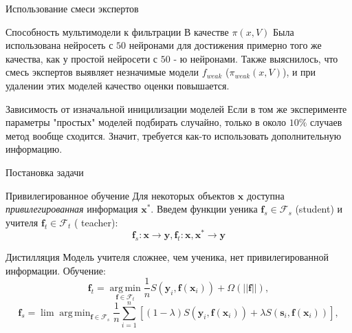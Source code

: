 \documentclass{beamer}
\DeclareMathOperator*{\argmin}{arg\,min}
\begin{document}
\begin{frame}{Использование смеси экспертов}
\begin{block}{Способность мультимодели к фильтрации}
В качестве $\pi(x, V)$ Была использована нейросеть с $50$ нейронами для достижения примерно того же качества, как у  простой нейросети  с $50$ - ю нейронами. Также выяснилось, что смесь экспертов выявляет незначимые модели $f_{weak}$ ($\pi_{weak} (x, V)$), и при удалении этих моделей качество оценки повышается. 
\end{block}


\begin{block}{Зависимость от изначальной иницилизации моделей}
Если в том же эксперименте  параметры "простых" моделей  подбирать случайно, только в около $10 \% $ случаев метод вообще  сходится. Значит, требуется как-то использовать дополнительную информацию.
\end{block}
\end{frame}


\begin{frame}{Постановка задачи}


 \begin{block}{Привилегированное обучение}
 Для некоторых объектов $\mathbf{x}$ доступна \emph{привилегированная} информация $\mathbf{x}^*$. Введем функции уеника $\mathbf{f}_s  \in \mathcal{F}_s$ (student) и учителя $\mathbf{f}_t \in \mathcal{F}_t$ ( teacher):
 $$ \mathbf{f}_s: \mathbf{x} \rightarrow \mathbf{y},   \mathbf{f}_t: \mathbf{x}, \mathbf{x}^* \rightarrow \mathbf{y}$$
 \end{block}

\begin{block}{Дистилляция}
Модель учителя сложнее, чем ученика, нет привилегированной информации.  Обучение:
$$ \mathbf{f}_t = \argmin\limits_{\mathbf{f} \in \mathcal{F}_t} \frac{1}{n} 
S (\mathbf{y}_i, \mathbf{f}(\mathbf{x}_i)) 
+ \Omega (|| \mathbf{f}||),
$$
$$ \mathbf{f}_s = \lim\argmin_{\mathbf{f} \in \mathcal{F}_s} \frac{1}{n} \sum\limits_{i=1}^n
\left[ (1 - \lambda) S (\mathbf{y}_i, \mathbf{f}(\mathbf{x}_i))  + 
 \lambda S (\mathbf{s}_i, \mathbf{f}(\mathbf{x}_i)) \right],$$
\end{block}

\end{frame}
\end{document}
